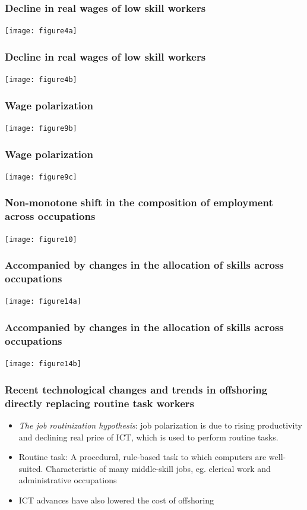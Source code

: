 \documentclass[mathserif]{beamer}
\begin{document}
\begin{frame}
\frametitle{Decline in real wages of low skill workers}
\texttt{[image: figure4a]}
\end{frame}
\begin{frame}
\frametitle{Decline in real wages of low skill workers}
\texttt{[image: figure4b]}
\end{frame}
\begin{frame}
\frametitle{Wage polarization}
\texttt{[image: figure9b]}
\end{frame}
\begin{frame}
\frametitle{Wage polarization}
\texttt{[image: figure9c]}
\end{frame}
\begin{frame}
 \frametitle{Non-monotone shift in the composition of employment across occupations}
\texttt{[image: figure10]}
\end{frame}
\begin{frame}
\frametitle{Accompanied by changes in the allocation of skills across occupations}
\texttt{[image: figure14a]}
\end{frame}
\begin{frame}
\frametitle{Accompanied by changes in the allocation of skills across occupations}
\texttt{[image: figure14b]}
\end{frame}
\begin{frame}
\frametitle{Recent technological changes and trends in offshoring directly replacing routine task workers}
\begin{itemize}
\item \textit{The job routinization hypothesis}: job polarization is due to rising productivity and declining real price of ICT, which is used to perform routine tasks.
\item Routine task: A procedural, rule-based task to which computers are well-suited. Characteristic of many middle-skill jobs, eg. clerical work and administrative occupations
\item ICT advances have also lowered the cost of offshoring
\end{itemize}
\end{frame}
\end{document}
